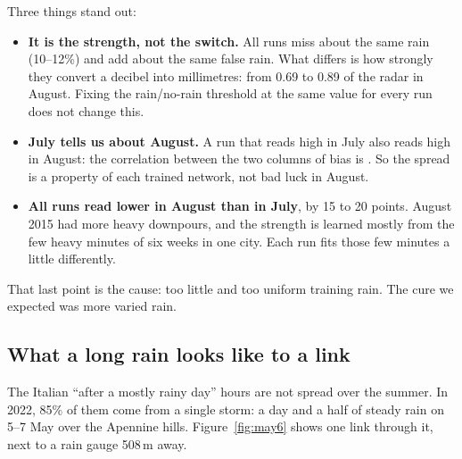 Three things stand out:
\begin{itemize}
\item \textbf{It is the strength, not the switch.} All runs miss about the same rain (10--12\%) and add about the same
false rain. What differs is how strongly they convert a decibel into millimetres: from 0.69 to 0.89 of the radar in August.
Fixing the rain/no-rain threshold at the same value for every run does not change this.
\item \textbf{July tells us about August.} A run that reads high in July also reads high in August: the correlation between
the two columns of bias is \SeedValTestR. So the spread is a property of each trained network, not bad luck in August.
\item \textbf{All runs read lower in August than in July}, by 15 to 20 points. August 2015 had more heavy downpours, and the
strength is learned mostly from the few heavy minutes of six weeks in one city. Each run fits those few minutes a little
differently.
\end{itemize}
That last point is the cause: too little and too uniform training rain. The cure we expected was more varied rain.

\subsection{What a long rain looks like to a link}
\label{sec:may6}
The Italian ``after a mostly rainy day'' hours are not spread over the summer. In 2022, 85\% of them come from a single
storm: a day and a half of steady rain on 5--7 May over the Apennine hills. Figure~\ref{fig:may6} shows one link through it,
next to a rain gauge 508\,m away.

